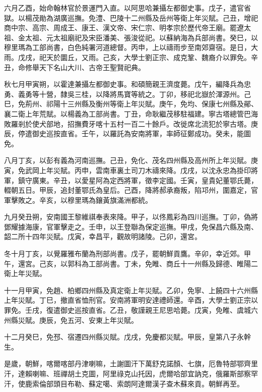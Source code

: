 \begin{pinyinscope}
六月乙酉，始命翰林官於景運門入直。以阿思哈兼攝左都御史事。戊子，遣官省獄。以楊茂勛為湖廣巡撫。免澧、巴陵十二州縣及岳州等衛上年災賦。己丑，增祀商中宗、高宗、周成王、康王、漢文帝、宋仁宗、明孝宗於歷代帝王廟。罷遼太祖、金太祖、元太祖廟祀及宋臣潘美、張浚從祀。以蘇納海為兵部尚書。癸巳，以穆里瑪為工部尚書，白色純署河道總督。丙申，上以禱雨步至南郊齋宿。是日，大雨。戊戌，祀天於圜丘，又雨。己亥，大學士劉正宗、成克鞏、魏裔介以罪免。辛丑，命修舉天下名山大川、古帝王聖賢祀典。

秋七月甲寅朔，以霍達兼攝左都御史事。和碩簡親王濟度薨。戊午，編降兵為忠勇、義勇等十營，隸吳三桂，以降將馬寶等統之。丁卯，移祀北嶽於渾源州。己巳，免荊州、祁陽十三州縣及衡州等衛上年災賦。庚午，免均、保康七州縣及鄖、襄二衛上年荒賦。以楊義為工部尚書。丁丑，命耿繼茂移駐福建。寧古塔總管巴海敗羅剎於使犬部地，招撫費牙喀十五村一百二十餘戶。改徙席北流犯於寧古塔。庚辰，停遣御史巡按直省。壬午，以羅託為安南將軍，率師征鄭成功。癸未，能圖免。

八月丁亥，以彭有義為河南巡撫。己丑，免化、茂名四州縣及高州所上年災賦。庚寅，免武岡上年災賦。丙申，雲南車裏土司刀木禱來降。戊戌，以沈永忠為掛印將軍，鎮守廣東。辛丑，以愛星阿為定西將軍，徵李定國。壬寅，皇貴妃董鄂氏薨，輟朝五日。甲辰，追封董鄂氏為皇后。己酉，降將郝承裔叛，陷邛州，圍嘉定，官軍擊敗之。辛亥，以穆里瑪為鑲黃旗滿洲都統。

九月癸丑朔，安南國王黎維祺奉表來降。甲子，以佟鳳彩為四川巡撫。丁卯，偽將鄧耀據海康，官軍擊走之。壬申，以王登聯為保定巡撫。甲戌，免保昌六縣及南、韶二所十四年災賦。戊寅，幸昌平，觀故明諸陵。己卯，還宮。

冬十月丁亥，以覺羅雅布蘭為刑部尚書。戊子，罷朝鮮貢鷹。辛卯，幸近郊。甲午，還宮。己亥，以郭科為工部尚書。丁未，免睢、商丘十一州縣及歸德、睢陽二衛上年災賦。

十一月甲寅，免趙、柏鄉四州縣及真定衛上年災賦。乙卯，免寧、上饒四十六州縣上年災賦。丁巳，撤直省恤刑官。安南將軍明安達禮師還。辛酉，大學士劉正宗以罪免。壬戌，復遣御史巡按直省。乙丑，敬謹親王尼思哈薨。戊寅，免睢、虞城六州縣災賦。庚辰，免五河、安東上年災賦。

十二月癸巳，免邳、宿遷四州縣災賦。戊戌，免慶都災賦。甲辰，皇第八子永幹生。

是歲，朝鮮，喀爾喀部丹津喇嘛，土謝圖汗下萬舒克諾顏、七旗，厄魯特部鄂齊里汗，達賴喇嘛、班禪胡土克圖，阿里祿克山托因，虎爾哈部宜訥克，俄羅斯部察罕汗，使鹿索倫部頭目布勒、蘇定噶、索朗阿達爾漢子查木蘇來貢。朝鮮再至。


\end{pinyinscope}
